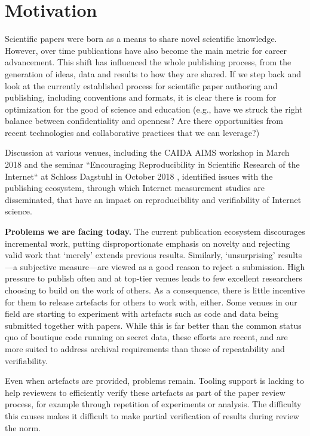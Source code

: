 \documentclass[sigconf,10pt]{acmart}
\begin{document}
\section{Motivation}
\label{sec:intro}

Scientific papers were born as a means to share novel scientific knowledge.
However, over time publications have also become the main metric for career
advancement. This shift has influenced the whole publishing process, from the
generation of ideas, data and results to how they are shared. If we step back
and look at the currently established process for scientific paper authoring and
publishing, including conventions and formats, it is clear there is room for
optimization for the good of science and education (e.g.,  have we struck the
right balance between confidentiality and openness? Are there opportunities from
recent technologies and collaborative practices that we can leverage?)

Discussion at various venues, including the CAIDA AIMS workshop in March 2018
\cite{aims-presentation} and the seminar ``Encouraging Reproducibility in
Scientific Research of the Internet`` at Schloss Dagstuhl in October 2018
\cite{dagstuhl-site}, identified issues with the publishing ecosystem, through
which Internet measurement studies are disseminated, that have an impact on
reproducibility and verifiability of Internet science.

\textbf{Problems we are facing today.} The current publication ecosystem
discourages incremental work, putting disproportionate emphasis on novelty and
rejecting valid work that `merely' extends previous results. Similarly,
`unsurprising' results---a subjective measure---are viewed as a good reason to
reject a submission. High pressure to publish often and at top-tier venues
leads to few excellent researchers choosing to build on the work of others. As
a consequence, there is little incentive for them to release artefacts for
others to work with, either. Some venues in our field are starting to
experiment with artefacts such as code and data being submitted together with
papers. While this is far better than the common status quo of boutique code
running on secret data, these efforts are recent, and are more suited to
address archival requirements than those of repeatability and verifiability. 

Even when artefacts are provided, problems remain. Tooling support is lacking
to help reviewers to efficiently verify these artefacts as part of the paper
review process, for example through repetition of experiments or analysis. The
difficulty this causes makes it difficult to make partial verification of
results during review the norm.
\end{document}
